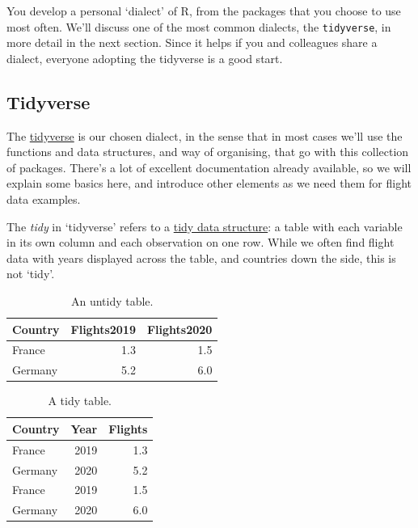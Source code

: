 \documentclass[
]{book}
\begin{document}
You develop a personal `dialect' of R, from the packages that you choose to use most often. We'll discuss one of the most common dialects, the \texttt{tidyverse}, in more detail in the next section. Since it helps if you and colleagues share a dialect, everyone adopting the tidyverse is a good start.

\hypertarget{tidyverse}{%
\subsection{Tidyverse}\label{tidyverse}}

The \href{https://www.tidyverse.org}{tidyverse} is our chosen dialect, in the sense that in most cases we'll use the functions and data structures, and way of organising, that go with this collection of packages. There's a lot of excellent documentation already available, so we will explain some basics here, and introduce other elements as we need them for flight data examples.

The \emph{tidy} in `tidyverse' refers to a \href{https://r4ds.had.co.nz/tidy-data.html}{tidy data structure}: a table with each variable in its own column and each observation on one row. While we often find flight data with years displayed across the table, and countries down the side, this is not `tidy'.

\begin{table}

\caption{\label{tab:unnamed-chunk-2}An untidy table.}
\centering
\begin{tabular}[t]{lrr}
\toprule
Country & Flights2019 & Flights2020\\
\midrule
France & 1.3 & 1.5\\
Germany & 5.2 & 6.0\\
\bottomrule
\end{tabular}
\end{table}

\begin{table}

\caption{\label{tab:unnamed-chunk-2}A tidy table.}
\centering
\begin{tabular}[t]{lrr}
\toprule
Country & Year & Flights\\
\midrule
France & 2019 & 1.3\\
Germany & 2020 & 5.2\\
France & 2019 & 1.5\\
Germany & 2020 & 6.0\\
\bottomrule
\end{tabular}
\end{table}
\end{document}
